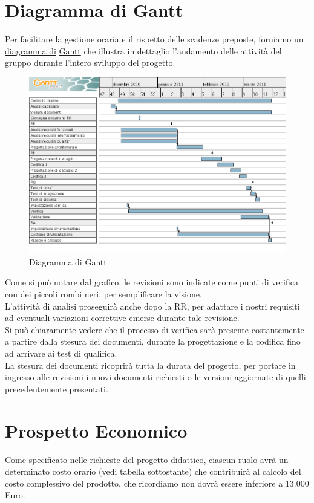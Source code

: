 \section{Diagramma di Gantt}
Per facilitare la gestione oraria e il rispetto delle scadenze preposte,
forniamo un \underline{diagramma di} \underline{Gantt} che illustra in dettaglio
l'andamento delle attivit\`a del gruppo durante l'intero sviluppo del progetto.
\vspace{0.8cm}
\begin{figure}[htbp]
  \centering
  \includegraphics[width=17.2cm, angle=0]{img/PP/gantt.png}
\caption{Diagramma di Gantt}
\end{figure}
\newpage

Come si pu\`o notare dal grafico, le revisioni sono indicate come punti di 
verifica con dei piccoli rombi neri, per semplificare la visione.\\
L'attivit\`a di analisi proseguir\`a anche dopo la RR, per adattare i nostri
requisiti ad eventuali variazioni correttive emerse durante tale revisione.\\

Si pu\`o chiaramente vedere che il processo di \underline{verifica} sar\`a
presente costantemente a partire dalla stesura dei documenti, durante la progettazione e
la codifica fino ad arrivare ai test di qualifica.\\

La stesura dei documenti ricoprir\`a tutta la durata del progetto, per portare
in ingresso alle revisioni i nuovi documenti richiesti o le versioni aggiornate
di quelli precedentemente presentati.

\section{Prospetto  Economico}
Come specificato nelle richieste del progetto didattico, ciascun ruolo avr\`a un
determinato costo orario (vedi tabella sottostante) che contribuir\`a al calcolo
del costo complessivo del prodotto, che ricordiamo non dovr\`a essere
inferiore a 13.000 Euro.

